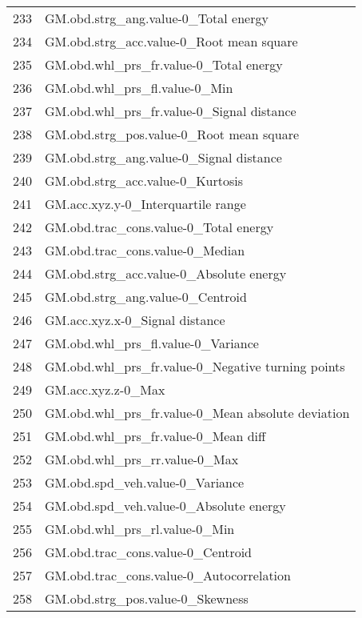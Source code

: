 \begin{tabular}{ll}
233 &               GM.obd.strg\_ang.value-0\_Total energy \\
234 &           GM.obd.strg\_acc.value-0\_Root mean square \\
235 &             GM.obd.whl\_prs\_fr.value-0\_Total energy \\
236 &                      GM.obd.whl\_prs\_fl.value-0\_Min \\
237 &          GM.obd.whl\_prs\_fr.value-0\_Signal distance \\
238 &           GM.obd.strg\_pos.value-0\_Root mean square \\
239 &            GM.obd.strg\_ang.value-0\_Signal distance \\
240 &                   GM.obd.strg\_acc.value-0\_Kurtosis \\
241 &                 GM.acc.xyz.y-0\_Interquartile range \\
242 &              GM.obd.trac\_cons.value-0\_Total energy \\
243 &                    GM.obd.trac\_cons.value-0\_Median \\
244 &            GM.obd.strg\_acc.value-0\_Absolute energy \\
245 &                   GM.obd.strg\_ang.value-0\_Centroid \\
246 &                     GM.acc.xyz.x-0\_Signal distance \\
247 &                 GM.obd.whl\_prs\_fl.value-0\_Variance \\
248 &  GM.obd.whl\_prs\_fr.value-0\_Negative turning points \\
249 &                                 GM.acc.xyz.z-0\_Max \\
250 &  GM.obd.whl\_prs\_fr.value-0\_Mean absolute deviation \\
251 &                GM.obd.whl\_prs\_fr.value-0\_Mean diff \\
252 &                      GM.obd.whl\_prs\_rr.value-0\_Max \\
253 &                    GM.obd.spd\_veh.value-0\_Variance \\
254 &             GM.obd.spd\_veh.value-0\_Absolute energy \\
255 &                      GM.obd.whl\_prs\_rl.value-0\_Min \\
256 &                  GM.obd.trac\_cons.value-0\_Centroid \\
257 &           GM.obd.trac\_cons.value-0\_Autocorrelation \\
258 &                   GM.obd.strg\_pos.value-0\_Skewness \\

\end{tabular}
